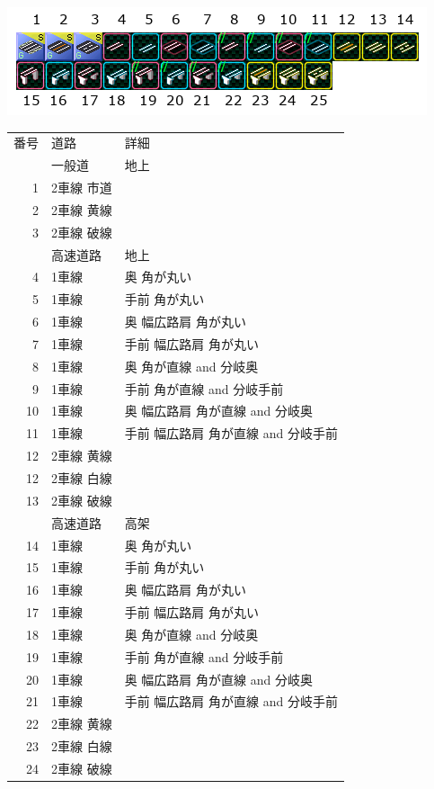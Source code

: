 \documentclass{jbook}
\begin{document}
\begin{flushleft}
  \includegraphics{picture/menu-1-1.png}
\end{flushleft}
\begin{tabular}{rll}
  番号 & 道路 & 詳細 \\
  & 一般道 & 地上 \\
  1 & 2車線 市道 & \\
  2 & 2車線 黄線  & \\
  3 & 2車線 破線 & \\
  & 高速道路 & 地上 \\
  4 & 1車線 & 奥 角が丸い \\
  5 & 1車線 & 手前 角が丸い \\
  6 & 1車線 & 奥 幅広路肩 角が丸い \\
  7 & 1車線 & 手前 幅広路肩 角が丸い \\
  8 & 1車線 & 奥 角が直線 and 分岐奥\\
  9 & 1車線 & 手前 角が直線 and 分岐手前\\
  10 & 1車線 & 奥 幅広路肩 角が直線  and 分岐奥\\
  11 & 1車線 & 手前 幅広路肩 角が直線 and 分岐手前\\
  12 & 2車線 黄線 & \\
  12 & 2車線 白線 & \\
  13 & 2車線 破線 & \\
  & 高速道路 & 高架 \\
  14 & 1車線 & 奥 角が丸い \\
  15 & 1車線 & 手前 角が丸い \\
  16 & 1車線 & 奥 幅広路肩 角が丸い \\
  17 & 1車線 & 手前 幅広路肩 角が丸い \\
  18 & 1車線 & 奥 角が直線 and 分岐奥\\
  19 & 1車線 & 手前 角が直線 and 分岐手前\\
  20 & 1車線 & 奥 幅広路肩 角が直線 and 分岐奥 \\
  21 & 1車線 & 手前 幅広路肩 角が直線 and 分岐手前\\
  22 & 2車線 黄線 & \\
  23 & 2車線 白線 & \\
  24 & 2車線 破線 & \\
\end{tabular}
\end{document}

